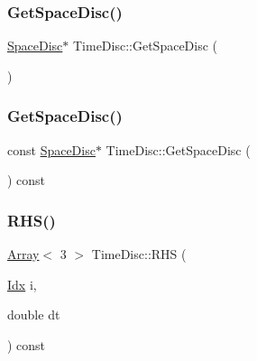 \mbox{\label{structTimeDisc_aeff8e840257aa405f1e32ea469312299}} 
\subsubsection{\texorpdfstring{Get\+Space\+Disc()}{GetSpaceDisc()}\hspace{0.1cm}{\footnotesize\ttfamily [1/2]}}
{\footnotesize\ttfamily \hyperlink{structSpaceDisc}{Space\+Disc}$\ast$ Time\+Disc\+::\+Get\+Space\+Disc (\begin{DoxyParamCaption}{ }\end{DoxyParamCaption})\hspace{0.3cm}{\ttfamily [inline]}}

\mbox{\label{structTimeDisc_af58702da70c28c0876f0342b627a5c63}} 
\subsubsection{\texorpdfstring{Get\+Space\+Disc()}{GetSpaceDisc()}\hspace{0.1cm}{\footnotesize\ttfamily [2/2]}}
{\footnotesize\ttfamily const \hyperlink{structSpaceDisc}{Space\+Disc}$\ast$ Time\+Disc\+::\+Get\+Space\+Disc (\begin{DoxyParamCaption}{ }\end{DoxyParamCaption}) const\hspace{0.3cm}{\ttfamily [inline]}}

\mbox{\label{structTimeDisc_a4fbce03e40554045b59958fceda7814d}} 
\subsubsection{\texorpdfstring{R\+H\+S()}{RHS()}}
{\footnotesize\ttfamily \hyperlink{Includes_8h_abd9de33944f934950000c3929e14ad8d}{Array}$<$ 3 $>$ Time\+Disc\+::\+R\+HS (\begin{DoxyParamCaption}\item[{\hyperlink{Includes_8h_ae78891cd308078a2f5f9e7193065c805}{Idx}}]{i,  }\item[{double}]{dt }\end{DoxyParamCaption}) const}

